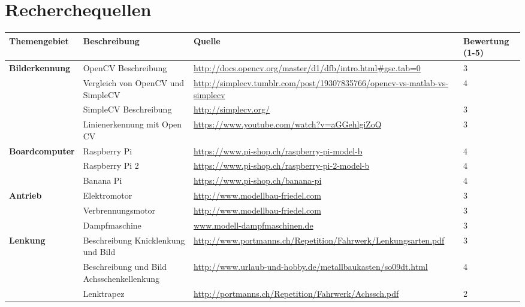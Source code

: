\section{Recherchequellen}
\begin{tabular}{|p{3cm}|p{3.5cm}|p{5cm}|p{2cm}|}\hline
	
	\textbf{Themengebiet}	& 	\textbf{Beschreibung} & \textbf{Quelle} & \textbf{Bewertung (1-5)} \\\hline
	
	
	\textbf{Bilderkennung}	&	OpenCV Beschreibung	&	\url{http://docs.opencv.org/master/d1/dfb/intro.html#gsc.tab=0}	&	3 \\\hline
				 			&	Vergleich von OpenCV und SimpleCV	&	\url{http://simplecv.tumblr.com/post/19307835766/opencv-vs-matlab-vs-simplecv}	&	4 \\\hline
				 			&	SimpleCV Beschreibung	&	\url{http://simplecv.org/}	&	3 \\\hline
				 			&	Linienerkennung mit Open CV	&	\url{https://www.youtube.com/watch?v=aGGehlgiZoQ}	&	3	\\\hline
				 			
\textbf{Boardcomputer}	& 	Raspberry Pi & \url{https://www.pi-shop.ch/raspberry-pi-model-b} & 4 \\\hline
						& 	Raspberry Pi 2 & \url{https://www.pi-shop.ch/raspberry-pi-2-model-b} & 4 \\\hline
						& 	Banana Pi & \url{https://www.pi-shop.ch/banana-pi} & 4 \\\hline	
						
\textbf{Antrieb}	& 	Elektromotor & \url{http://www.modellbau-friedel.com} & 3 \\\hline
					& 	Verbrennungsmotor & \url{http://www.modellbau-friedel.com} & 3 \\\hline
					& 	Dampfmaschine & \url{www.modell-dampfmaschinen.de} & 3 \\\hline
					
\textbf{Lenkung} &  Beschreibung Knicklenkung und Bild & \url{http://www.portmanns.ch/Repetition/Fahrwerk/Lenkungsarten.pdf} & 3 \\\hline

& Beschreibung und Bild Achsschenkellenkung & \url{http://www.urlaub-und-hobby.de/metallbaukasten/so09dt.html} & 4 \\\hline 

& Lenktrapez & \url{http://portmanns.ch/Repetition/Fahrwerk/Achssch.pdf} & 2 \\\hline 


\end{tabular}
